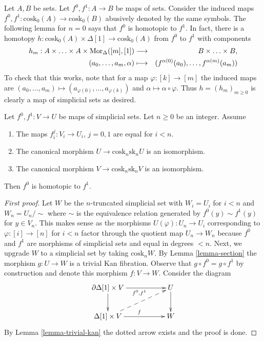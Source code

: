 \noindent
Let $A, B$ be sets. Let $f^0, f^1 : A \to B$ be maps of sets.
Consider the induced maps $f^0, f^1 : \text{cosk}_0(A) \to \text{cosk}_0(B)$
abusively denoted by the same symbols. The following lemma for $n = 0$
says that $f^0$ is homotopic to $f^1$. In fact, there is a
homotopy $h : \text{cosk}_0(A) \times \Delta[1] \to \text{cosk}_0(A)$
from $f^0$ to $f^1$ with components
\begin{eqnarray*}
h_m : A \times \ldots \times A \times \mathop{\mathrm{Mor}}\nolimits_{\Delta}([m], [1])
& \longrightarrow &
B \times \ldots \times B, \\
(a_0, \ldots, a_m, \alpha) & \longmapsto &
(f^{\alpha(0)}(a_0), \ldots, f^{\alpha(m)}(a_m))
\end{eqnarray*}
To check that this works, note that for a map $\varphi : [k] \to [m]$
the induced maps are
$(a_0, \ldots, a_m) \mapsto (a_{\varphi(0)}, \ldots, a_{\varphi(k)})$
and $\alpha \mapsto \alpha \circ \varphi$. Thus $h = (h_m)_{m \geq 0}$
is clearly a map of simplicial sets as desired.

\begin{lemma}
\label{lemma-homotopy}
Let $f^0, f^1 : V \to U$ be maps of simplicial sets.
Let $n \geq 0$ be an integer.
Assume
\begin{enumerate}
\item The maps $f^j_i : V_i \to U_i$, $j = 0, 1$ are equal for $i < n$.
\item The canonical morphism $U \to \text{cosk}_n \text{sk}_n U$
is an isomorphism.
\item The canonical morphism $V \to \text{cosk}_n \text{sk}_n V$
is an isomorphism.
\end{enumerate}
Then $f^0$ is homotopic to $f^1$.
\end{lemma}

\begin{proof}[First proof]
Let $W$ be the $n$-truncated simplicial set with $W_i = U_i$ for
$i < n$ and $W_n = U_n / \sim$ where $\sim$ is the equivalence relation
generated by $f^0(y) \sim f^1(y)$ for $y \in V_n$. This makes sense
as the morphisms $U(\varphi) : U_n \to U_i$ corresponding to
$\varphi : [i] \to [n]$ for $i < n$ factor through the quotient map
$U_n \to W_n$ because $f^0$ and $f^1$ are morphisms of simplicial sets and
equal in degrees $< n$. Next, we upgrade $W$ to a simplicial set
by taking $\text{cosk}_n W$. By Lemma \ref{lemma-section}
the morphism $g : U \to W$ is a trivial Kan fibration. Observe
that $g \circ f^0 = g \circ f^1$ by construction and denote
this morphism $f : V \to W$. Consider the diagram
$$
\xymatrix{
\partial \Delta[1] \times V \ar[rr]_{f^0, f^1} \ar[d] & & U \ar[d] \\
\Delta[1] \times V \ar[rr]^f \ar@{-->}[rru] & & W
}
$$
By Lemma \ref{lemma-trivial-kan} the dotted arrow exists and the proof is done.
\end{proof}

